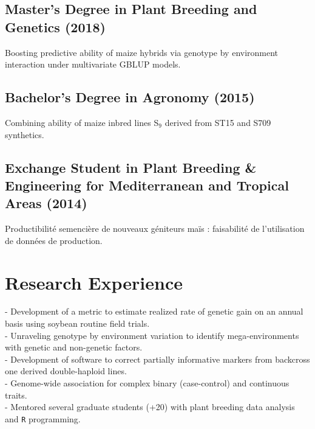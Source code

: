 \documentclass[]{mdkrause_cv_openfont}
\begin{document}
\begin{minipage}[t]{1\textwidth}
\sectionsep

\subsection{Master's Degree in Plant Breeding and Genetics (2018)}
 Boosting predictive ability of maize hybrids via genotype by environment interaction under multivariate GBLUP models.

\sectionsep

\subsection{Bachelor's Degree in Agronomy (2015)}
 Combining ability of maize inbred lines S$_9$ derived from ST15 and S709 synthetics.

\sectionsep

\subsection{Exchange Student in Plant Breeding \& Engineering for Mediterranean and Tropical Areas (2014)}
 Productibilité semencière de nouveaux géniteurs maïs : faisabilité de l’utilisation de données de production.

\sectionsep


\section{Research Experience}

\sectionsep

- Development of a metric to estimate realized rate of genetic gain on an annual basis using soybean routine field trials. \\
- Unraveling genotype by environment variation to identify mega-environments with genetic and non-genetic factors. \\
- Development of software to correct partially informative markers from backcross one derived double-haploid lines. \\
- Genome-wide association for complex binary (case-control) and continuous traits. \\
- Mentored several graduate students (+20) with plant breeding data analysis and \texttt{R} programming. 


\end{minipage}
\end{document}
